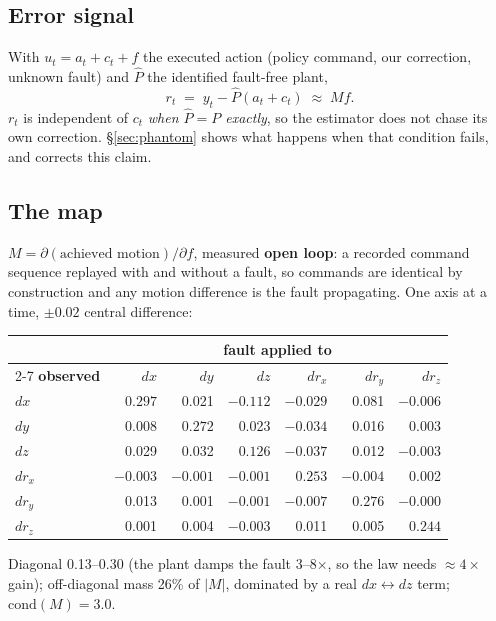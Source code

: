 \documentclass[11pt,a4paper]{article}
\begin{document}
\subsection{Error signal}

With $u_t = a_t + c_t + f$ the executed action (policy command, our correction,
unknown fault) and $\hat P$ the identified fault-free plant,
\begin{equation}
r_t \;=\; y_t - \hat P(a_t + c_t) \;\approx\; M f .
\end{equation}
$r_t$ is independent of $c_t$ \emph{when $\hat P = P$ exactly}, so the estimator
does not chase its own correction. \S\ref{sec:phantom} shows what happens when
that condition fails, and corrects this claim.

\subsection{The map}

$M = \partial(\text{achieved motion})/\partial f$, measured \textbf{open loop}: a
recorded command sequence replayed with and without a fault, so commands are
identical by construction and any motion difference is the fault propagating.
One axis at a time, $\pm 0.02$ central difference:

\begin{center}
\small
\begin{tabular}{lrrrrrr}
\toprule
 & \multicolumn{6}{c}{\textbf{fault applied to}} \\
\cmidrule(l){2-7}
\textbf{observed} & $dx$ & $dy$ & $dz$ & $d r_x$ & $d r_y$ & $d r_z$ \\
\midrule
$dx$    & $\mathbf{0.297}$ & 0.021 & $-0.112$ & $-0.029$ & 0.081 & $-0.006$ \\
$dy$    & 0.008 & $\mathbf{0.272}$ & 0.023 & $-0.034$ & 0.016 & 0.003 \\
$dz$    & 0.029 & 0.032 & $\mathbf{0.126}$ & $-0.037$ & 0.012 & $-0.003$ \\
$d r_x$ & $-0.003$ & $-0.001$ & $-0.001$ & $\mathbf{0.253}$ & $-0.004$ & 0.002 \\
$d r_y$ & 0.013 & 0.001 & $-0.001$ & $-0.007$ & $\mathbf{0.276}$ & $-0.000$ \\
$d r_z$ & 0.001 & 0.004 & $-0.003$ & 0.011 & 0.005 & $\mathbf{0.244}$ \\
\bottomrule
\end{tabular}
\end{center}

Diagonal 0.13--0.30 (the plant damps the fault 3--8$\times$, so the law needs
$\approx 4\times$ gain); off-diagonal mass 26\% of $|M|$, dominated by a real
$dx \!\leftrightarrow\! dz$ term; $\mathrm{cond}(M) = 3.0$.
\end{document}
